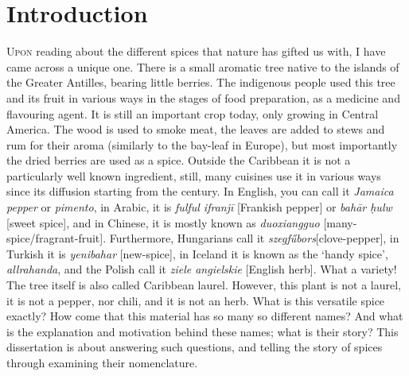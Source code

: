 



\chapter{Introduction}
\label{ch:introduction}





\lettrine[lines=\iniciale]{\textcolor{\accentcolor}{U}}{pon} reading about the different spices that nature has gifted us with, I have came across a unique one. There is a small aromatic tree native to the islands of the Greater Antilles, bearing little berries. The indigenous people used this tree and its fruit in various ways in the stages of food preparation, as a medicine and flavouring agent. It is still an important crop today, only growing in Central America. The wood is used to smoke meat, the leaves are added to stews and rum for their aroma (similarly to the bay-leaf in Europe), but most importantly the dried berries are used as a spice. Outside the Caribbean it is not a particularly well known ingredient, still, many cuisines use it in various ways since its diffusion starting from the  century. In English, you can call it \textit{Jamaica pepper} or \textit{pimento}, in Arabic, it is \textit{fulful ifranjī} [Frankish pepper] or \textit{bah\={a}r ḥulw} [sweet spice], and in Chinese, it is mostly known as \textit{duoxiangguo} [many-spice/fragrant-fruit]. Furthermore, Hungarians call it \textit{szegfűbors}[clove-pepper], in Turkish it is \textit{yenibahar} [new-spice], in Iceland it is known as the `handy spice', \textit{allrahanda}, and the Polish call it \textit{ziele angielskie} [English herb]. What a variety! The tree itself is also called Caribbean laurel. However, this plant is not a laurel, it is not a pepper, nor chili, and it is not an herb. What is this versatile spice exactly? How come that this material has so many so different names? And what is the explanation and motivation behind these names; what is their story? This dissertation is about answering such questions, and telling the story of spices through examining their nomenclature.

